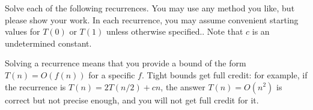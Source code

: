 \message{ !name(1-recurrence.tex)}\documentclass[addpoints]{exam}
\newcommand{\BigT}[1]{\Theta\left( #1\right)}
\begin{document}
\begin{questions}


Solve each of the following recurrences. You may use any method you like, but please show your work. In each recurrence, you may assume convenient starting values for $T(0)$ or $T(1)$ unless otherwise specified.. Note that $c$ is an undetermined constant. 

Solving a recurrence means that you provide a bound of the form $T(n) = O(f(n))$ for a specific $f$. Tight bounds get full credit: for example, if the recurrence is $T(n) = 2T(n/2) + cn$, the answer $T(n) = O(n^2)$ is correct but not precise enough, and you will not get full credit for it. 

\end{questions}
\end{document}
